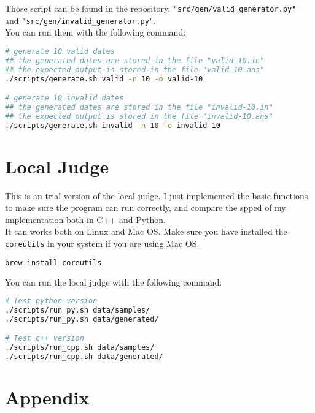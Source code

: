 \documentclass[a4paper,12pt]{article} %
\begin{document}
Those script can be found in the repository, \texttt{"src/gen/valid\_generator.py"} 
\\
and \texttt{"src/gen/invalid\_generator.py"}. 
\\
You can run them with the following command:

\begin{lstlisting}[language=bash,style=mybash, frame=trbl]
# generate 10 valid dates
## the generated dates are stored in the file "valid-10.in" 
## the expected output is stored in the file "valid-10.ans"
./scripts/generate.sh valid -n 10 -o valid-10 

# generate 10 invalid dates
## the generated dates are stored in the file "invalid-10.in"
## the expected output is stored in the file "invalid-10.ans"
./scripts/generate.sh invalid -n 10 -o invalid-10
\end{lstlisting}

\section{Local Judge}

This is an trial version of the local judge. 
I just implemented the basic functions, 
to make sure the program can run correctly,
and compare the spped of my implementation both in C++ and Python.
\\

It can works both on Linux and Mac OS. 
Make sure you have installed the \texttt{coreutils} in your system if you are using Mac OS.

\begin{lstlisting}[language=bash,style=mybash, frame=trbl]
 brew install coreutils
\end{lstlisting}

You can run the local judge with the following command:

\begin{lstlisting}[language=bash,style=mybash, frame=trbl]
# Test python version
./scripts/run_py.sh data/samples/
./scripts/run_py.sh data/generated/

# Test c++ version
./scripts/run_cpp.sh data/samples/
./scripts/run_cpp.sh data/generated/
\end{lstlisting}

\newpage

\section*{Appendix}
\end{document}
